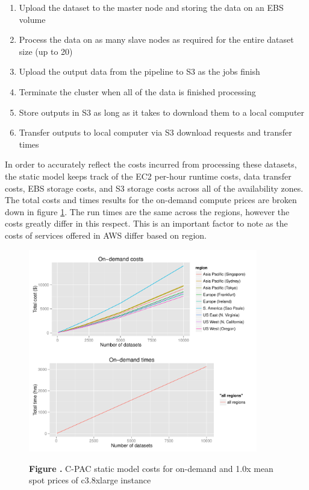 \documentclass{frontiersSCNS} %
\begin{document}
\begin{enumerate}
\item Upload the dataset to the master node and storing the data on an EBS volume
\item Process the data on as many slave nodes as required for the entire dataset size (up to 20)
\item Upload the output data from the pipeline to S3 as the jobs finish
\item Terminate the cluster when all of the data is finished processing
\item Store outputs in S3 as long as it takes to download them to a local computer
\item Transfer outputs to local computer via S3 download requests and transfer times
\end{enumerate}

In order to accurately reflect the costs incurred from processing these datasets, the static model keeps track of the EC2 per-hour runtime costs, data transfer costs, EBS storage costs, and S3 storage costs across all of the availability zones. The total costs and times results for the on-demand compute prices are broken down in figure \ref{fig:01}. The run times are the same across the regions, however the costs greatly differ in this respect. This is an important factor to note as the costs of services offered in AWS differ based on region.

\begin{figure}[!ht]
\begin{center}
\includegraphics[width=10cm]{../../spot-model/plots/cpac_ondemand.pdf}%
\end{center}
 \textbf{\label{fig:01} Figure .}{ C-PAC static model costs for on-demand and 1.0x mean spot prices of c3.8xlarge instance }
\end{figure}
\end{document}
